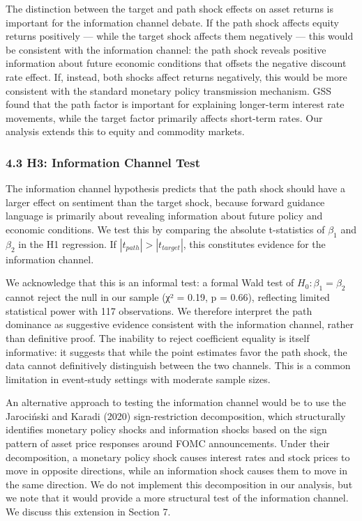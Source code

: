 \documentclass[12pt]{article}
\begin{document}
The distinction between the target and path shock effects on asset
returns is important for the information channel debate. If the path
shock affects equity returns positively --- while the target shock
affects them negatively --- this would be consistent with the
information channel: the path shock reveals positive information about
future economic conditions that offsets the negative discount rate
effect. If, instead, both shocks affect returns negatively, this would
be more consistent with the standard monetary policy transmission
mechanism. GSS found that the path factor is important for explaining
longer-term interest rate movements, while the target factor primarily
affects short-term rates. Our analysis extends this to equity and
commodity markets.

\subsubsection{4.3 H3: Information Channel
Test}\label{h3-information-channel-test}

The information channel hypothesis predicts that the path shock should
have a larger effect on sentiment than the target shock, because forward
guidance language is primarily about revealing information about future
policy and economic conditions. We test this by comparing the absolute
t-statistics of \(\beta_1\) and \(\beta_2\) in the H1 regression. If
\(|t_{path}| > |t_{target}|\), this constitutes evidence for the
information channel.

We acknowledge that this is an informal test: a formal Wald test of
\(H_0: \beta_1 = \beta_2\) cannot reject the null in our sample (χ² =
0.19, p = 0.66), reflecting limited statistical power with 117
observations. We therefore interpret the path dominance as suggestive
evidence consistent with the information channel, rather than definitive
proof. The inability to reject coefficient equality is itself
informative: it suggests that while the point estimates favor the path
shock, the data cannot definitively distinguish between the two
channels. This is a common limitation in event-study settings with
moderate sample sizes.

An alternative approach to testing the information channel would be to
use the Jarociński and Karadi (2020) sign-restriction decomposition,
which structurally identifies monetary policy shocks and information
shocks based on the sign pattern of asset price responses around FOMC
announcements. Under their decomposition, a monetary policy shock causes
interest rates and stock prices to move in opposite directions, while an
information shock causes them to move in the same direction. We do not
implement this decomposition in our analysis, but we note that it would
provide a more structural test of the information channel. We discuss
this extension in Section 7.
\end{document}
